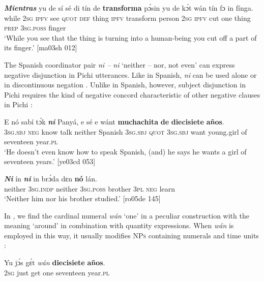 \ea%
    \label{ex:key:1729}
    \gll \textbf{\textit{Mientras}}    yu  de  sí  sé  di  tín    de  \textbf{transforma}  pɔ́sin
yu  de  kɔ́t  wán    tín    fɔ  in    fínga.\\
while    \textsc{2sg}  \textsc{ipfv}  see  \textsc{quot}  \textsc{def}  thing  \textsc{ipfv}  transform  person
\textsc{2sg}  \textsc{ipfv}  cut  one    thing  \textsc{prep}  \textsc{3sg.poss}  finger\\

\glt ‘While you see that the thing is turning into a human-being you cut 
off a part of its finger.’ [ma03sh 012]
\z

The Spanish coordinator pair \textit{ni – ni} ‘neither – nor, not even’ can express negative disjunction in Pichi utterances. Like in Spanish, \textit{ni} can be used alone  or in discontinuous negation . Unlike in Spanish, however, subject disjunction in Pichi requires the kind of negative concord characteristic of other negative clauses in Pichi : 


\ea%
    \label{ex:key:1730}
    \gll E    nó  sabí    tɔ́k  \textbf{\textit{ni}}    Panyá,  e    sé
e    wánt  \textbf{muchachita}  \textbf{de}  \textbf{diecisiete}    \textbf{años}.\\
\textsc{3sg.sbj}  \textsc{neg}  know  talk  neither  Spanish  \textsc{3sg.sbj}  \textsc{quot}  
\textsc{3sg.sbj}  want  young.girl  of  seventeen  year.\textsc{pl}\\

\glt ‘He doesn’t even know how to speak Spanish, (and) he says he wants 
a girl of seventeen years.’ [ye03cd 053]
\z


\ea%
    \label{ex:key:1731}
    \gll \textbf{\textit{Ni}}    ín    \textbf{\textit{ni}}    in    brɔ́da  dɛn  \textbf{nó}  lán.\\
neither  \textsc{3sg.indp}  neither  \textsc{3sg.poss}  brother  \textsc{3pl}  \textsc{neg}  learn\\

\glt ‘Neither him nor his brother studied.’ [ro05de 145]
\z

In , we find the cardinal numeral \textit{wán} ‘one’ in a peculiar construction with the meaning ‘around’ in combination with quantity expressions.\textit{} When \textit{wán} is employed in this way, it usually modifies \textsc{NPs} containing numerals  and time units : 


\ea%
    \label{ex:key:1732}
    \gll Yu  jɔ́s  gɛ́t \textit{wán}    \textbf{diecisiete}    \textbf{años}.\\
\textsc{2sg}  just  get  one    seventeen  year.\textsc{pl}\\

